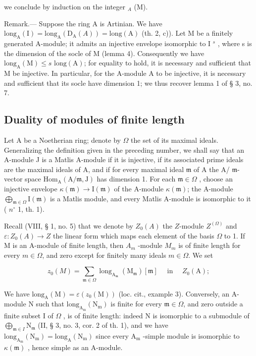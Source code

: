 we conclude by induction on the integer \(_{A}\) (M).

Remark.--- Suppose the ring A is Artinian. We have \(\text{long}_{\text{A}}(\text{I}) = \text{long}_{\text{A}}(\text{D}_{\text{A}}(A)) = \text{long}(\text{A})\) (th. 2, c)). Let M be a finitely generated A-module; it admits an injective envelope isomorphic to I \(^{s}\) , where s is the dimension of the socle of M (lemma 4). Consequently we have \(\text{long}_{\text{A}}(\text{M}) \leqslant s \text{ long}(\text{A})\); for equality to hold, it is necessary and sufficient that M be injective. In particular, for the A-module A to be injective, it is necessary and sufficient that its socle have dimension 1; we thus recover lemma 1 of § 3, no. 7.

\subsection{Duality of modules of finite length}

Let A be a Noetherian ring; denote by \(\Omega\) the set of its maximal ideals. Generalizing the definition given in the preceding number, we shall say that an A-module J is a Matlis A-module if it is injective, if its associated prime ideals are the maximal ideals of A, and if for every maximal ideal \(\mathfrak{m}\) of A the A/ \(\mathfrak{m}\)-vector space \(\mathrm{Hom}_{\mathrm{A}}(\mathrm{A}/\mathfrak{m},\mathrm{J})\) has dimension 1. For each \(\mathfrak{m} \in \Omega\) , choose an injective envelope \(\kappa(\mathfrak{m}) \to \mathrm{I}(\mathfrak{m})\) of the A-module \(\kappa(\mathfrak{m})\); the A-module \(\bigoplus_{\mathfrak{m} \in \Omega} \mathrm{I}(\mathfrak{m})\) is a Matlis module, and every Matlis A-module is isomorphic to it ( \(n^{\circ}\) 1, th. 1).

Recall (VIII, § 1, no. 5) that we denote by \(Z_0(A)\) the \(Z\)-module \(Z^{(\Omega)}\) and \(\varepsilon : Z_0(A) \to Z\) the linear form which maps each element of the basis \(\Omega\) to 1. If M is an A-module of finite length, then \(A_m\) -module \(M_m\) is of finite length for every \(m \in \Omega\), and zero except for finitely many ideals \(m \in \Omega\). We set

\[
z _ {0} (M) = \sum_ {\mathfrak {m} \in \Omega} \operatorname{long} _ {\mathrm{A} _ {\mathfrak {m}}} (\mathrm{M} _ {\mathfrak {m}}) [ \mathfrak {m} ] \quad \text { in } \quad Z _ {0} (\mathrm{A});
\]

We have \(\mathrm{long}_{\mathrm{A}}(\mathrm{M}) = \varepsilon(z_0(\mathrm{M}))\) (loc. cit., example 3). Conversely, an A-module N such that \(\mathrm{long}_{\mathrm{A_m}}(\mathrm{N_m})\) is finite for every \(\mathfrak{m} \in \Omega\), and zero outside a finite subset I of \(\Omega\) , is of finite length: indeed N is isomorphic to a submodule of \(\bigoplus_{\mathfrak{m} \in I} \mathrm{N}_{\mathfrak{m}}\) (II, § 3, no. 3, cor. 2 of th. 1), and we have \(\mathrm{long}_{\mathrm{A_m}}(\mathrm{N_m}) = \mathrm{long}_\mathrm{A}(\mathrm{N_m})\) since every \(\mathrm{A_m}\) -simple module is isomorphic to \(\kappa(\mathfrak{m})\) , hence simple as an A-module.

